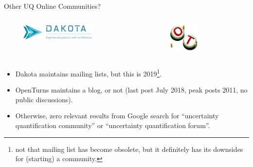 \documentclass[]{rsuqbeamernew}
\begin{document}
\begin{frame}[t]{Other UQ Online Communities?}

\begin{columns}
  \begin{figure}
    \includegraphics[width=0.70\textwidth]{../figures/dakota}
  \end{figure}
  
  \begin{figure}
    \includegraphics[width=0.45\textwidth]{../figures/openTurns}
  \end{figure}
\end{columns}

\begin{itemize}
  \item Dakota maintains mailing lists,
        but this is 2019\footnote{not that mailing list has become obsolete, but it definitely has its downsides for (starting) a community.}.
  \item OpenTurns maintains a blog, or not (last post July 2018, peak posts 2011, no public discussions). 
  \item Otherwise, zero relevant results from Google search
        for ``uncertainty quantification community'' or ``uncertainty quantification forum''.
\end{itemize}

\end{frame}
\end{document}
